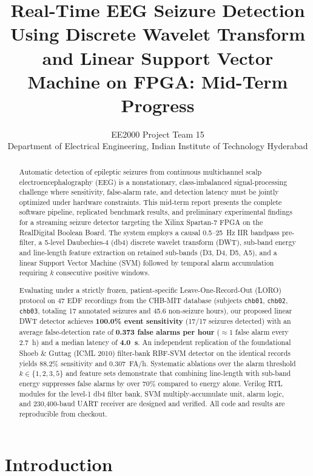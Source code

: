 \documentclass[10pt,twocolumn,letterpaper]{article}
\title{Real-Time EEG Seizure Detection Using Discrete Wavelet Transform\\
and Linear Support Vector Machine on FPGA: Mid-Term Progress}
\author{EE2000 Project Team 15\\
Department of Electrical Engineering, Indian Institute of Technology Hyderabad}
\begin{document}
\maketitle

\begin{abstract}
Automatic detection of epileptic seizures from continuous multichannel scalp electroencephalography (EEG) is a nonstationary, class-imbalanced signal-processing challenge where sensitivity, false-alarm rate, and detection latency must be jointly optimized under hardware constraints. This mid-term report presents the complete software pipeline, replicated benchmark results, and preliminary experimental findings for a streaming seizure detector targeting the Xilinx Spartan-7 FPGA on the RealDigital Boolean Board. The system employs a causal 0.5--25~Hz IIR bandpass pre-filter, a 5-level Daubechies-4 (db4) discrete wavelet transform (DWT), sub-band energy and line-length feature extraction on retained sub-bands (D3, D4, D5, A5), and a linear Support Vector Machine (SVM) followed by temporal alarm accumulation requiring $k$ consecutive positive windows.

Evaluating under a strictly frozen, patient-specific Leave-One-Record-Out (LORO) protocol on 47 EDF recordings from the CHB-MIT database (subjects \texttt{chb01}, \texttt{chb02}, \texttt{chb03}, totaling 17 annotated seizures and 45.6 non-seizure hours), our proposed linear DWT detector achieves \textbf{100.0\% event sensitivity} (17/17 seizures detected) with an average false-detection rate of \textbf{0.373 false alarms per hour} ($\approx 1$ false alarm every 2.7~h) and a median latency of \textbf{4.0~s}. An independent replication of the foundational Shoeb \& Guttag (ICML 2010) filter-bank RBF-SVM detector on the identical records yields 88.2\% sensitivity and 0.307~FA/h. Systematic ablations over the alarm threshold $k \in \{1, 2, 3, 5\}$ and feature sets demonstrate that combining line-length with sub-band energy suppresses false alarms by over 70\% compared to energy alone. Verilog RTL modules for the level-1 db4 filter bank, SVM multiply-accumulate unit, alarm logic, and 230,400-baud UART receiver are designed and verified. All code and results are reproducible from checkout.
\end{abstract}

\section{Introduction}
\label{sec:intro}
\end{document}
